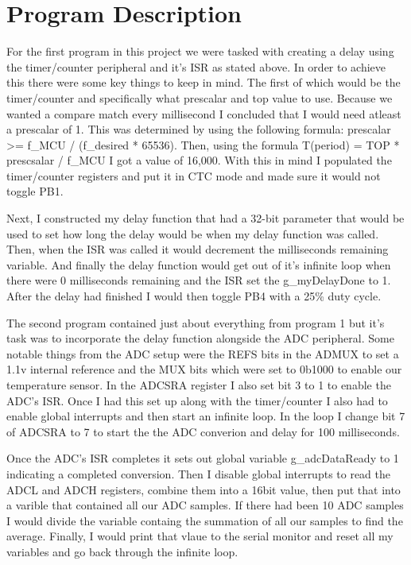 \documentclass[11pt,pdftex,portrait,letterpaper]{article}
\begin{document}
	
	\section{Program Description}
	
	For the first program in this project we were tasked with creating a delay using the timer/counter peripheral and it's ISR as stated above. In order to achieve this there were some key things to keep in mind. The first of which would be the timer/counter and specifically what prescalar and top value to use. Because we wanted a compare match every millisecond I concluded that I would need atleast a prescalar of 1. This was determined by using the following formula: prescalar >= f\_MCU / (f\_desired * 65536). Then, using the formula T(period) = TOP * prescsalar / f\_MCU  I got a value of 16,000. With this in mind I populated the timer/counter registers and put it in CTC mode and made sure it would not toggle PB1. 
	
	Next, I constructed my delay function that had a 32-bit parameter that would be used to set how long the delay would be when my delay function was called. Then, when the ISR was called it would decrement the milliseconds remaining variable. And finally the delay function would get out of it's infinite loop when there were 0 milliseconds remaining and  the ISR set the g\_myDelayDone to 1. After the delay had finished I would then toggle PB4 with a 25\% duty cycle.
	
	The second program contained just about everything from program 1 but it's task was to incorporate the delay function alongside the ADC peripheral. Some notable things from the ADC setup were the REFS bits in the ADMUX to set a 1.1v internal reference and the MUX bits which were set to 0b1000 to enable our temperature sensor. In the ADCSRA register I also set bit 3 to 1 to enable the ADC's ISR. Once I had this set up along with the timer/counter I also had to enable global interrupts and then start an infinite loop. In the loop I change bit 7 of ADCSRA to 7 to start the the ADC converion and delay for 100 milliseconds.
	
	Once the ADC's ISR completes it sets out global variable g\_adcDataReady to 1 indicating a completed conversion. Then I disable global interrupts to read the ADCL and ADCH registers, combine them into a 16bit value, then put that into a varible that contained all our ADC samples. If there had been 10 ADC samples I would divide the variable containg the summation of all our samples to find the average. Finally, I would print that vlaue to the serial monitor and reset all my variables and go back through the infinite loop.
	
\end{document}
